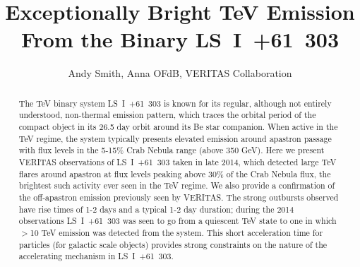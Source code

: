 \documentclass[preprint2]{aastex}
\newcommand{\lsi}{LS~I~+61~303}
\begin{document}

\title{Exceptionally Bright TeV Emission From the Binary \lsi{}}


\author{
Andy Smith,
Anna OFdB,
VERITAS Collaboration
}




\begin{abstract}
The TeV binary system \lsi{} is known for its regular, although not entirely understood, non-thermal emission pattern, which traces the orbital period of the compact object in its 26.5 day orbit around its Be star companion. When active in the TeV regime, the system typically presents elevated emission around apastron passage with flux levels in the 5-15$\%$ Crab Nebula range (above 350 GeV). Here we present VERITAS observations of \lsi{} taken in late 2014, which detected large TeV flares around apastron at flux levels peaking above 30$\%$ of the Crab Nebula flux, the brightest such activity ever seen in the TeV regime. We also provide a confirmation of the off-apastron emission previously seen by VERITAS. The strong outbursts observed have rise times of 1-2 days and a typical 1-2 day duration; during the 2014 observations \lsi{} was seen to go from a quiescent TeV state to one in which $>$10 TeV emission was detected from the system. This short acceleration time for particles (for galactic scale objects) provides strong constraints on the nature of the accelerating mechanism in \lsi{}.


\end{abstract}
\end{document}
